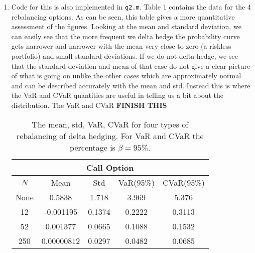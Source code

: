\documentclass[10pt,english]{article}
\theoremstyle{plain}
\begin{document}
\begin{enumerate}
\begin{enumerate}
\item Code for this is also implemented in \texttt{q2.m}. Table 1 contains the data for the 4 rebalancing options. As can be seen, this table gives a more quantitative assessment of the figures. Looking at the mean and standard deviation, we can easily see that the more frequent we delta hedge the probability curve gets narrower and narrower with the mean very close to zero (a riskless portfolio) and small standard deviations. If we do not delta hedge, we see that the standard deviation and mean of that case do not give a clear picture of what is going on unlike the other cases which are approximately normal and can be described accurately with the mean and std. Instead this is where the VaR and CVaR quantities are useful in telling us a bit about the distribution. The VaR and CVaR  \textbf{FINISH THIS}
\begin{table}[t]

\centering
\begin{tabular}{|c|c|c|c|c|}
\multicolumn{5}{c}{Call Option}\\
\hline
	$N$ & Mean & Std & VaR(95\%) & CVaR(95\%)  \\
\hline
	None & 0.5838 & 1.718 & 3.969 & 5.376 \\
	12	&	-0.001195 & 0.1374 & 0.2222 & 0.3113 \\
	52	&	 0.001377 & 0.0665 & 0.1088 & 0.1532 \\
	250	&		0.00000812 & 0.0297 & 0.0482 & 0.0685\\
\hline
\end{tabular}
\caption{The mean, std, VaR, CVaR for four types of rebalancing of delta hedging. For VaR and CVaR the percentage is $\beta=95\%$.}
\end{table}
\end{enumerate}


\end{enumerate}
\end{document}

